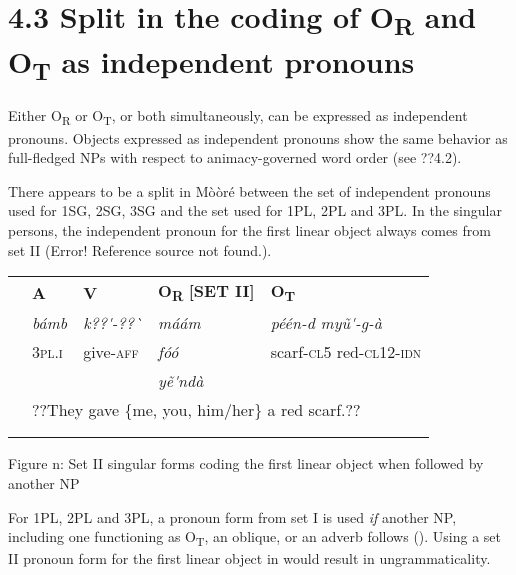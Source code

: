 \documentclass[output=paper]{langsci/langscibook}
\begin{document}
\section{4.3 Split in the coding of O\textsubscript{R} and O\textsubscript{T} as independent pronouns}

Either O\textsubscript{R} or O\textsubscript{T}, or both simultaneously, can be expressed as independent pronouns. Objects expressed as independent pronouns show the same behavior as full-fledged NPs with respect to animacy-governed word order (see ??4.2). 

There appears to be a split in Mòòré between the set of independent pronouns used for 1SG, 2SG, 3SG and the set used for 1PL, 2PL and 3PL. In the singular persons, the independent pronoun for the first linear object always comes from set II (Error! Reference source not found.). 

\begin{tabular}{lllll} & \textbf{A} & \textbf{V} & \textbf{O}\textbf{\textsubscript{R}}\textbf{ [SET II]} & \textbf{O}\textbf{\textsubscript{T}}\\
\lsptoprule
& \textit{bámb} & \textit{k??\'{ }-??\`{ }} & \textit{máám} & \textit{péén-d      myũ\'{ }-g-à}\\
& 3\textsc{pl.i} & give-\textsc{aff} & \textit{fóó} & scarf-\textsc{cl5 } red-\textsc{cl12-idn}\\
&  &  & \textit{yẽ\'{ }ndà} & \\
& \multicolumn{4}{l}{??They gave \{me, you, him/her\} a red scarf.??}\\
& \multicolumn{4}{l}{}\\
\lspbottomrule
\end{tabular}
\begin{styleTabellenberschrift}
Figure n: Set II singular forms coding the first linear object when followed by another NP
\end{styleTabellenberschrift}

For 1PL, 2PL and 3PL, a pronoun form from set I is used \textit{if} another NP, including one functioning as O\textsubscript{T}, an oblique, or an adverb follows (). Using a set II pronoun form for the first linear object in  would result in ungrammaticality.
\end{document}
